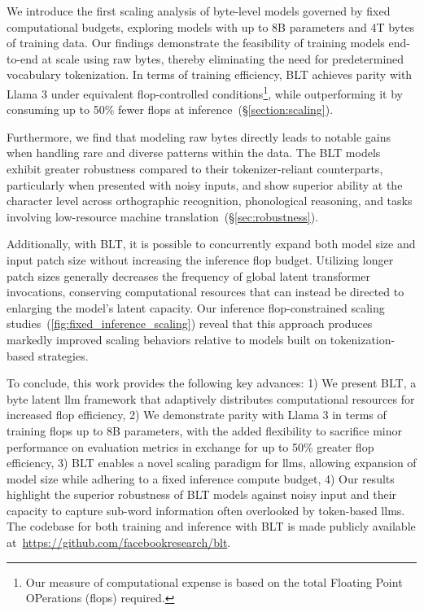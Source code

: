 We introduce the first scaling analysis of byte-level models governed by fixed computational budgets, exploring models with up to 8B parameters and 4T bytes of training data. Our findings demonstrate the feasibility of training models end-to-end at scale using raw bytes, thereby eliminating the need for predetermined vocabulary tokenization. In terms of training efficiency, {\textsc BLT} achieves parity with Llama 3 under equivalent flop-controlled conditions\footnote{Our measure of computational expense is based on the total Floating Point OPerations (flops) required.}, while outperforming it by consuming up to 50\% fewer flops at inference~(\S\ref{section:scaling}). 

Furthermore, we find that modeling raw bytes directly leads to notable gains when handling rare and diverse patterns within the data. The {\textsc BLT} models exhibit greater robustness compared to their tokenizer-reliant counterparts, particularly when presented with noisy inputs, and show superior ability at the character level across orthographic recognition, phonological reasoning, and tasks involving low-resource machine translation~(\S\ref{sec:robustness}). 

Additionally, with {\textsc BLT}, it is possible to concurrently expand both model size and input patch size without increasing the inference flop budget. Utilizing longer patch sizes generally decreases the frequency of global latent transformer invocations, conserving computational resources that can instead be directed to enlarging the model’s latent capacity. Our inference flop-constrained scaling studies~(\autoref{fig:fixed_inference_scaling}) reveal that this approach produces markedly improved scaling behaviors relative to models built on tokenization-based strategies.

To conclude, this work provides the following key advances: 1) We present {\textsc BLT}, a byte latent llm framework that adaptively distributes computational resources for increased flop efficiency, 2) We demonstrate parity with Llama 3 in terms of training flops up to 8B parameters, with the added flexibility to sacrifice minor performance on evaluation metrics in exchange for up to 50\% greater flop efficiency, 3) {\textsc BLT} enables a novel scaling paradigm for llms, allowing expansion of model size while adhering to a fixed inference compute budget, 4) Our results highlight the superior robustness of {\textsc BLT} models against noisy input and their capacity to capture sub-word information often overlooked by token-based llms. The codebase for both training and inference with {\textsc BLT} is made publicly available at~\url{https://github.com/facebookresearch/blt}.

